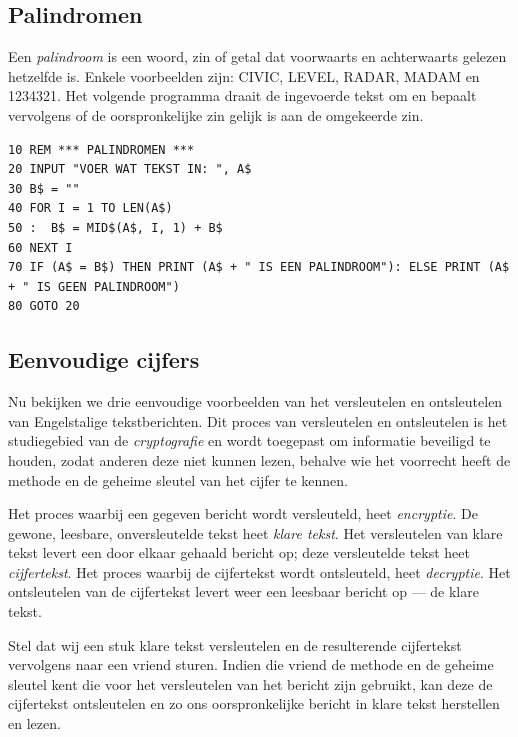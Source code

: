 \subsection{Palindromen}

Een {\it palindroom} is een woord, zin of getal dat voorwaarts en achterwaarts gelezen hetzelfde is. Enkele voorbeelden zijn: CIVIC, LEVEL, RADAR, MADAM en 1234321. Het volgende programma draait de ingevoerde tekst om en bepaalt vervolgens of de oorspronkelijke zin gelijk is aan de omgekeerde zin.

\begin{tcolorbox}[colback=black,coltext=white]
\verbatimfont{\codefont}
\begin{verbatim}
10 REM *** PALINDROMEN ***
20 INPUT "VOER WAT TEKST IN: ", A$
30 B$ = ""
40 FOR I = 1 TO LEN(A$)
50 :  B$ = MID$(A$, I, 1) + B$
60 NEXT I
70 IF (A$ = B$) THEN PRINT (A$ + " IS EEN PALINDROOM"): ELSE PRINT (A$ + " IS GEEN PALINDROOM")
80 GOTO 20
\end{verbatim}
\end{tcolorbox}


\subsection{Eenvoudige cijfers}

Nu bekijken we drie eenvoudige voorbeelden van het versleutelen en ontsleutelen van Engelstalige tekstberichten. Dit proces van versleutelen en ontsleutelen is het studiegebied van de {\it cryptografie} en wordt toegepast om informatie beveiligd te houden, zodat anderen deze niet kunnen lezen, behalve wie het voorrecht heeft de methode en de geheime sleutel van het cijfer te kennen.

Het proces waarbij een gegeven bericht wordt versleuteld, heet {\it encryptie}. De gewone, leesbare, onversleutelde tekst heet {\it klare tekst}. Het versleutelen van klare tekst levert een door elkaar gehaald bericht op; deze versleutelde tekst heet {\it cijfertekst}. Het proces waarbij de cijfertekst wordt ontsleuteld, heet {\it decryptie}. Het ontsleutelen van de cijfertekst levert weer een leesbaar bericht op --- de klare tekst.

Stel dat wij een stuk klare tekst versleutelen en de resulterende cijfertekst vervolgens naar een vriend sturen. Indien die vriend de methode en de geheime sleutel kent die voor het versleutelen van het bericht zijn gebruikt, kan deze de cijfertekst ontsleutelen en zo ons oorspronkelijke bericht in klare tekst herstellen en lezen.

